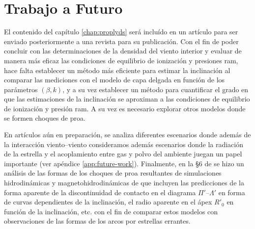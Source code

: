 \section{Trabajo a Futuro}

El contenido del capítulo \ref{chap:proplyds} será incluído en un artículo para ser enviado posteriormente a una revista para su publicación. Con el fin de poder concluir con las determinaciones de la densidad del viento interior y evaluar de manera más eficaz las condiciones de equilibrio de ionización y presiones ram, hace falta establecer un método más eficiente para estimar la inclinación al comparar las mediciones con el modelo de capa delgada en función de los parámetros $(\beta, k)$, y a su vez establecer un método para cuantificar el grado en que las estimaciones de la inclinación se aproximan a las condiciones de equilibrio de ionización y presión ram. A su vez es necesario explorar otros modelos donde se formen choques de proa.

En artículos aún en preparación, se analiza diferentes escenarios donde además de la interacción viento--viento consideramos además escenarios donde la radiación de la estrella y el acoplamiento entre gas y polvo del ambiente juegan un papel importante (ver apéndice \ref{app:future-work}). Finalmente, en la \S 6 de \citet{Tarango-Yong:2018a} se hizo un análisis de las formas de los choques de proa resultantes de simulaciones hidrodinámicas y magnetohidrodinámicas de \citet{Meyer:2017} que incluyen las predicciones de la forma aparente de la discontinuidad de contacto en el diagrama $\Pi'$--$\Lambda'$ en forma de curvas dependientes de la inclinación, el radio aparente en el ápex $R'_0$ en función de la inclinación, etc. con el fin de comparar estos modelos con observaciones de las formas de los arcos por estrellas errantes. 

